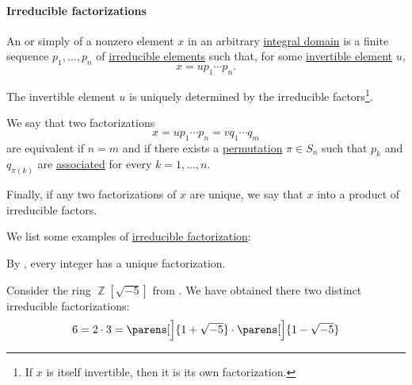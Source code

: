 \paragraph{Irreducible factorizations}

\begin{definition}\label{def:irreducible_factorization}
  An  or simply  of a nonzero element \( x \) in an arbitrary \hyperref[def:integral_domain]{integral domain} is a finite sequence \( p_1, \ldots, p_n \) of \hyperref[def:domain_divisibility/irreducible]{irreducible elements} such that, for some \hyperref[def:divisibility/invertible]{invertible element} \( u \),
  \begin{equation*}
    x = u p_1 \cdots p_n.
  \end{equation*}

  The invertible element \( u \) is uniquely determined by the irreducible factors\footnote{If \( x \) is itself invertible, then it is its own factorization.}.

  \begin{thmenum}
     We say that two factorizations
    \begin{equation*}
      x = u p_1 \cdots p_n = v q_1 \cdots q_m
    \end{equation*}
    are equivalent if \( n = m \) and if there exists a \hyperref[def:symmetric_group]{permutation} \( \pi \in S_n \) such that \( p_k \) and \( q_{\pi(k)} \) are \hyperref[def:domain_divisibility/associates]{associated} for every \( k = 1, \ldots, n \).

     Finally, if any two factorizations of \( x \) are unique, we say that \( x \)  into a product of irreducible factors.
  \end{thmenum}
\end{definition}

\begin{example}\label{ex:def:irreducible_factorization}
  We list some examples of \hyperref[def:irreducible_factorization]{irreducible factorization}:
  \begin{thmenum}
     By , every integer has a unique factorization.

     Consider the ring \( \BbbZ[\sqrt{-5}] \) from . We have obtained there two distinct irreducible factorizations:
    \begin{equation*}
      6 = 2 \cdot 3 = \parens[\Big]{ 1 + \sqrt{-5} } \cdot \parens[\Big]{ 1 - \sqrt{-5}}
    \end{equation*}
  \end{thmenum}
\end{example}


